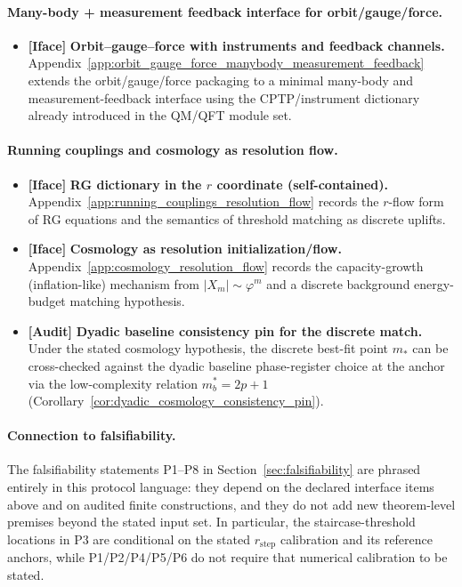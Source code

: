 \paragraph{Many-body + measurement feedback interface for orbit/gauge/force.}
\begin{itemize}
\item \textbf{[Iface]} \textbf{Orbit--gauge--force with instruments and feedback channels.}
Appendix~\ref{app:orbit_gauge_force_manybody_measurement_feedback} extends the orbit/gauge/force packaging to a minimal many-body and measurement-feedback interface using the CPTP/instrument dictionary already introduced in the QM/QFT module set.
\end{itemize}

\paragraph{Running couplings and cosmology as resolution flow.}
\begin{itemize}
\item \textbf{[Iface]} \textbf{RG dictionary in the $r$ coordinate (self-contained).}
Appendix~\ref{app:running_couplings_resolution_flow} records the $r$-flow form of RG equations and the semantics of threshold matching as discrete uplifts.
\item \textbf{[Iface]} \textbf{Cosmology as resolution initialization/flow.}
Appendix~\ref{app:cosmology_resolution_flow} records the capacity-growth (inflation-like) mechanism from $|X_m|\sim \varphi^m$ and a discrete background energy-budget matching hypothesis.
\item \textbf{[Audit]} \textbf{Dyadic baseline consistency pin for the discrete match.}
Under the stated cosmology hypothesis, the discrete best-fit point $m_\ast$ can be cross-checked against the dyadic baseline phase-register choice at the anchor via the low-complexity relation $m_b^\ast=2p+1$ (Corollary~\ref{cor:dyadic_cosmology_consistency_pin}).
\end{itemize}

\paragraph{Connection to falsifiability.}
The falsifiability statements P1--P8 in Section~\ref{sec:falsifiability} are phrased entirely in this protocol language:
they depend on the declared interface items above and on audited finite constructions, and they do not add new theorem-level premises beyond the stated input set.
In particular, the staircase-threshold locations in P3 are conditional on the stated $r_{\mathrm{step}}$ calibration and its reference anchors, while P1/P2/P4/P5/P6 do not require that numerical calibration to be stated.

